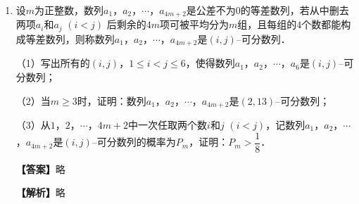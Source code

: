\documentclass[UTF8,a4paper]{ctexart}
\begin{document}
\begin{enumerate}[series=s3, leftmargin=2em, itemsep=0.8em]
（3）若 $f(x)>-2$当且仅当 $1<x<2$，求 $b$的取值范围．



\par\noindent\textbf{【答案】}略
\par\noindent\textbf{【解析】}略



\item
设$m$为正整数，数列$a_1$，$a_2$，$\cdots$，$a_{4m+2}$是公差不为$0$的等差数列，若从中删去两项$a_i$和$a_j$ $(i<j)$ 后剩余的$4m$项可被平均分为$m$组，且每组的$4$个数都能构成等差数列，则称数列$a_1$，$a_2$，$\cdots$，$a_{4m+2}$是$(i,j)$--可分数列．

（1）写出所有的$(i,j)$，$1\leqslant i<j\leqslant 6$，使得数列$a_1$，$a_2$，$\cdots$，$a_{6}$是$(i,j)$--可分数列；

（2）当$m\geqslant 3$时，证明：数列$a_1$，$a_2$，$\cdots$，$a_{4m+2}$是$(2,13)$--可分数列；

（3）从$1$，$2$，$\cdots$，$4m+2$中一次任取两个数$i$和$j$ $(i<j)$，记数列$a_1$，$a_2$，$\cdots$，$a_{4m+2}$是$(i,j)$--可分数列的概率为$P_m$，证明：$P_m>\dfrac{1}{8}$．



\par\noindent\textbf{【答案】}略
\par\noindent\textbf{【解析】}略


\end{enumerate}
\vspace{1em}
\end{document}
